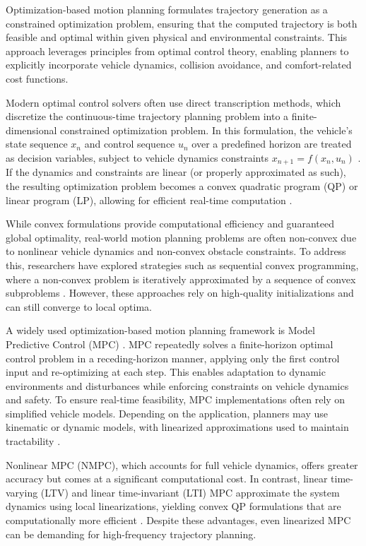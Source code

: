 Optimization-based motion planning formulates trajectory generation as a constrained optimization problem, ensuring that the computed trajectory is
both feasible and optimal within given physical and environmental constraints.
This approach leverages principles from optimal control theory, enabling planners to explicitly incorporate vehicle dynamics, collision avoidance,
and comfort-related cost functions.

Modern optimal control solvers often use direct transcription methods, which discretize the continuous-time trajectory planning problem into a
finite-dimensional constrained optimization problem.
In this formulation, the vehicle's state sequence $x_n$ and control sequence $u_n$ over a predefined horizon are treated as decision variables,
subject to vehicle dynamics constraints $x_{n+1} = f(x_n, u_n)$ \cite{tedrake2023trajopt}.
If the dynamics and constraints are linear (or properly approximated as such), the resulting optimization problem becomes a convex quadratic program
(QP) or linear program (LP), allowing for efficient real-time computation \cite{tedrake2023trajopt}.

While convex formulations provide computational efficiency and guaranteed global optimality, real-world motion planning problems are often non-convex
due to nonlinear vehicle dynamics and non-convex obstacle constraints.
To address this, researchers have explored strategies such as sequential convex programming, where a non-convex problem is iteratively approximated
by a sequence of convex subproblems \cite{schulman_finding_2013}.
However, these approaches rely on high-quality initializations and can still converge to local optima.

A widely used optimization-based motion planning framework is Model Predictive Control (MPC) \cite{falcone_predictive_2007, gray_robust_2013}.
MPC repeatedly solves a finite-horizon optimal control problem in a receding-horizon manner, applying only the first control input and re-optimizing
at each step.
This enables adaptation to dynamic environments and disturbances while enforcing constraints on vehicle dynamics and safety.
To ensure real-time feasibility, MPC implementations often rely on simplified vehicle models.
Depending on the application, planners may use kinematic or dynamic models, with linearized approximations used to maintain tractability
\cite{xia_survey_2024}.

Nonlinear MPC (NMPC), which accounts for full vehicle dynamics, offers greater accuracy but comes at a significant computational cost.
In contrast, linear time-varying (LTV) and linear time-invariant (LTI) MPC approximate the system dynamics using local linearizations, yielding
convex QP formulations that are computationally more efficient \cite{xia_survey_2024}.
Despite these advantages, even linearized MPC can be demanding for high-frequency trajectory planning.

